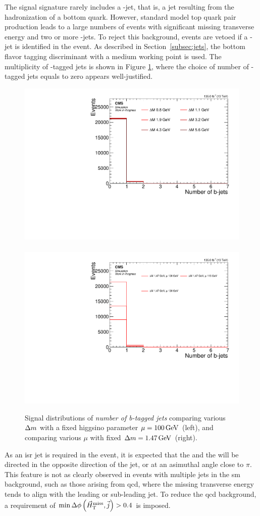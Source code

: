 The signal signature rarely includes a \PQb-jet, that is, a jet resulting from the hadronization of a bottom quark. However, standard model top quark pair production leads to a large numbers of events with significant missing transverse energy and two or more \PQb-jets. To reject this background, events are vetoed if a \PQb-jet is identified in the event. As described in Section~\ref{subsec:jets}, the \DEEPCSV bottom flavor tagging discriminant with a medium working point is used. The multiplicity of \PQb-tagged jets is shown in Figure \ref{fig:signal-bjets}, where the choice of number of \PQb-tagged jets equals to zero appears well-justified. 

\begin{figure}[!htb]
\centering
\includegraphics[width=0.48\linewidth]{plots/signal_common_distributions_fixed_mu/none_BTagsDeepMedium.pdf} \,
\includegraphics[width=0.48\linewidth]{plots/signal_common_distributions_fixed_dm/none_BTagsDeepMedium.pdf}  \\
\caption[Signal \emph{number of b-tagged jets} distributions]{ Signal distributions of \emph{number of b-tagged jets} comparing various $\Delta m$ with a fixed higgsino parameter $\mu=100\,\text{Ge\hspace{-.08em}V}$ (left), and comparing various $\mu$ with fixed $\Delta m=1.47\,\text{Ge\hspace{-.08em}V}$ (right).}
\label{fig:signal-bjets}
\end{figure}

As an \gls{isr} jet is required in the event, it is expected that the \MET and the \mht will be directed in the opposite direction of the jet, or at an asimuthal angle close to $\pi$. This feature is not as clearly observed in events with multiple jets in the \gls{sm} background, such as those arising from \gls{qcd}, where the missing transverse energy tends to align with the leading or sub-leading jet. To reduce the \gls{qcd} background, a requirement of $\min{\Delta\phi\left(\ensuremath{\vec{H}_{\text{T}}^{\text{miss}}},\vec{j}\right)} > 0.4$ is imposed.

